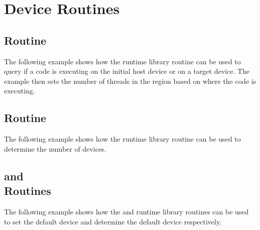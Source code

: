 \pagebreak
\section{Device Routines}
\label{sec:device}

\subsection{ Routine}
\label{subsec:device_is_initial}

The following example shows how the  runtime library routine 
can be used to query if a code is executing on the initial host device or on a 
target device. The example then sets the number of threads in the  
region based on where the code is executing.



\subsection{ Routine}
\label{subsec:device_num_devices}

The following example shows how the  runtime library routine 
can be used to determine the number of devices.



\subsection{ and \\
 Routines}
\label{subsec:device_is_set_get_default}

The following example shows how the  and  
runtime library routines can be used to set the default device and determine the 
default device respectively.



